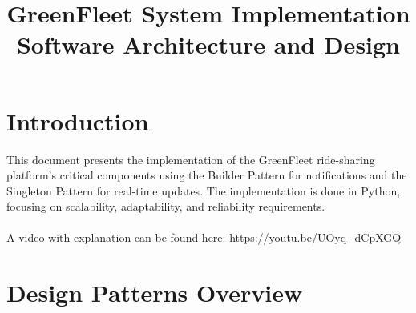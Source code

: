 \documentclass[12pt]{article}
\title{GreenFleet System Implementation\\Software Architecture and Design}
\author{\fontsize{10.5}{0}\selectfont{\underline{Name and Student Identification}: Arfaz Hossain, V00984826}}
\date{}
\begin{document}
\maketitle\vspace{-2em}
\vspace{-3em}

\section{Introduction}
This document presents the implementation of the GreenFleet ride-sharing platform's critical components using the Builder Pattern for notifications and the Singleton Pattern for real-time updates. The implementation is done in Python, focusing on scalability, adaptability, and reliability requirements. \\\\A video with explanation can be found here: \textcolor{purple}{\url{https://youtu.be/UOyq_dCpXGQ}}
\section{Design Patterns Overview}
\end{document}
